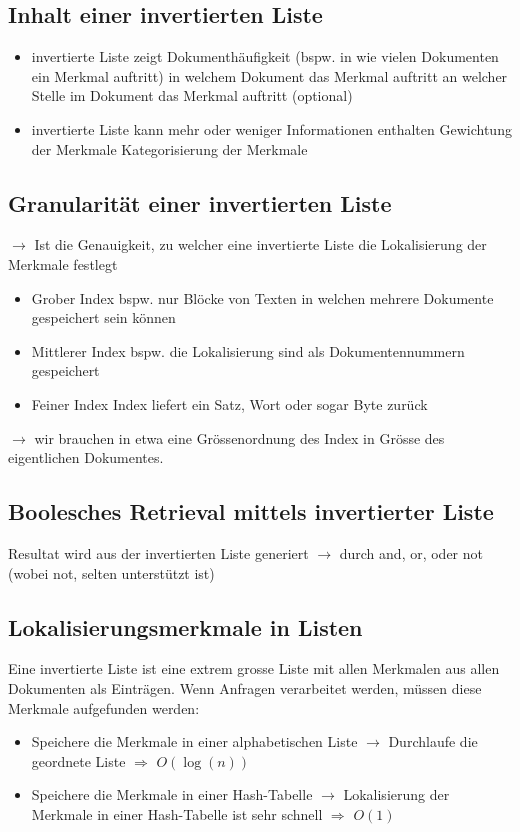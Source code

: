 \documentclass{report}
\theoremstyle{definition}
\theoremstyle{example}
\begin{document}
\subsection{Inhalt einer invertierten Liste}
\begin{itemize}
   \item invertierte Liste zeigt
   \subitem Dokumenthäufigkeit (bspw. in wie vielen Dokumenten ein Merkmal auftritt)
   \subitem in welchem Dokument das Merkmal auftritt
   \subitem an welcher Stelle im Dokument das Merkmal auftritt (optional)
   \item invertierte Liste kann mehr oder weniger Informationen enthalten
   \subitem Gewichtung der Merkmale
   \subitem Kategorisierung der Merkmale
\end{itemize}

\subsection{Granularität einer invertierten Liste}
$\rightarrow$ Ist die Genauigkeit, zu welcher eine invertierte Liste die Lokalisierung der Merkmale festlegt

\begin{itemize}
   \item Grober Index
   \subitem bspw. nur Blöcke von Texten in welchen mehrere Dokumente gespeichert sein können 
   \item Mittlerer Index
   \subitem bspw. die Lokalisierung sind als Dokumentennummern gespeichert 
   \item Feiner Index
   \subitem Index liefert ein Satz, Wort oder sogar Byte zurück 
\end{itemize}
$\rightarrow$ wir brauchen in etwa eine Grössenordnung des Index in Grösse des eigentlichen Dokumentes.

\subsection{Boolesches Retrieval mittels invertierter Liste}
Resultat wird aus der invertierten Liste generiert $\rightarrow$ durch and, or, oder not (wobei not, selten unterstützt ist)

\subsection{Lokalisierungsmerkmale in Listen}
Eine invertierte Liste ist eine extrem grosse Liste mit allen Merkmalen aus allen Dokumenten als Einträgen. Wenn Anfragen verarbeitet werden, müssen diese Merkmale aufgefunden werden:
\begin{itemize}
   \item Speichere die Merkmale in einer alphabetischen Liste $\rightarrow$ Durchlaufe die geordnete Liste $\Rightarrow$ $O(\log(n))$
   \item Speichere die Merkmale in einer Hash-Tabelle $\rightarrow$ Lokalisierung der Merkmale in einer Hash-Tabelle ist sehr schnell $\Rightarrow$ $O(1)$
\end{itemize}
\end{document}
